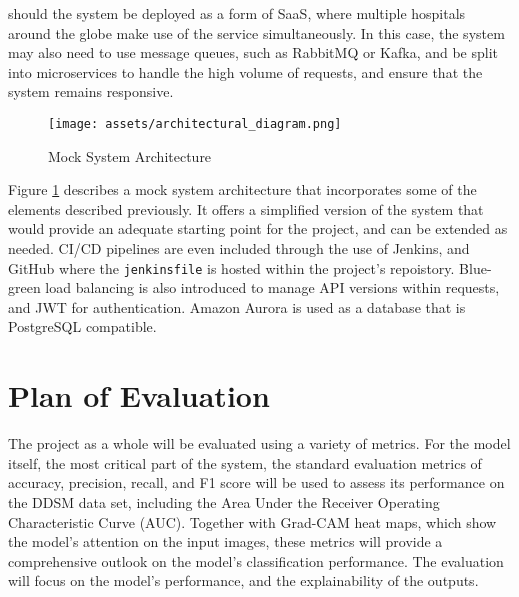 \documentclass[../main]{subfiles}
\begin{document}
should the system be deployed as a form of SaaS, where multiple hospitals around the globe make use of the service simultaneously. In this case, the system may also need to use message queues, such as RabbitMQ or Kafka, and be split into microservices to handle the high volume of requests, and ensure that the system remains responsive.

\begin{figure}[htbp]
    \centering
    \texttt{[image: assets/architectural\_diagram.png]}
    \caption{Mock System Architecture}
    \label{fig:system_architecture}
\end{figure}

\noindent Figure \ref{fig:system_architecture} describes a mock system architecture that incorporates some of the elements described previously. It offers a simplified version of the system that would provide an adequate starting point for the project, and can be extended as needed. CI/CD pipelines are even included through the use of Jenkins, and GitHub where the \texttt{jenkinsfile} is hosted within the project's repoistory. Blue-green load balancing is also introduced to manage API versions within requests, and JWT for authentication. Amazon Aurora is used as a database that is PostgreSQL compatible.

\section{Plan of Evaluation}
The project as a whole will be evaluated using a variety of metrics. For the model itself, the most critical part of the system, the standard evaluation metrics of accuracy, precision, recall, and F1 score will be used to assess its performance on the DDSM data set, including the Area Under the Receiver Operating Characteristic Curve (AUC). Together with Grad-CAM heat maps, which show the model's attention on the input images, these metrics will provide a comprehensive outlook on the model's classification performance. The evaluation will focus on the model's performance, and the explainability of the outputs.
\end{document}
